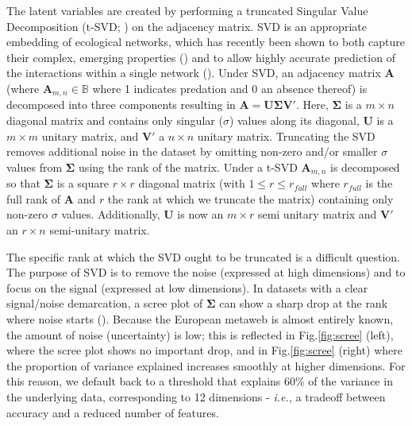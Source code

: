 \begin{refsection}
The latent variables are created by performing a truncated Singular
Value Decomposition (t-SVD; \cite{Halko2011Finding}) on the adjacency
matrix. SVD is an appropriate embedding of ecological networks, which
has recently been shown to both capture their complex, emerging
properties (\cite{Strydom2021SvdEnt}) and to allow highly accurate
prediction of the interactions within a single network
(\cite{Poisot2021ImpMam}). Under SVD, an adjacency matrix \(\mathbf{A}\)
(where \(\mathbf{A}_{m,n}\in\mathbb{B}\) where 1 indicates predation and
0 an absence thereof) is decomposed into three components resulting in
\(\mathbf{A} = \mathbf{U}\mathbf{\Sigma}\mathbf{V'}.\) Here,
\(\mathbf{\Sigma}\) is a \(m \times n\) diagonal matrix and contains
only singular (\(\sigma\)) values along its diagonal, \(\mathbf{U}\) is
a \(m \times m\) unitary matrix, and \(\mathbf{V}'\) a \(n \times n\)
unitary matrix. Truncating the SVD removes additional noise in the
dataset by omitting non-zero and/or smaller \(\sigma\) values from
\(\mathbf{\Sigma}\) using the rank of the matrix. Under a t-SVD
\(\mathbf{A}_{m,n}\) is decomposed so that \(\mathbf{\Sigma}\) is a
square \(r \times r\) diagonal matrix (with \(1 \le r \le r_{full}\)
where \(r_{full}\) is the full rank of \(\mathbf{A}\) and \(r\) the rank
at which we truncate the matrix) containing only non-zero \(\sigma\)
values. Additionally, \(\mathbf{U}\) is now an \(m \times r\) semi
unitary matrix and \(\mathbf{V}'\) an \(r \times n\) semi-unitary
matrix.

The specific rank at which the SVD ought to be truncated is a difficult
question. The purpose of SVD is to remove the noise (expressed at high
dimensions) and to focus on the signal (expressed at low dimensions). In
datasets with a clear signal/noise demarcation, a scree plot of
\(\mathbf{\Sigma}\) can show a sharp drop at the rank where noise starts
(\cite{Zhu2006Automatic}). Because the European metaweb is almost entirely
known, the amount of noise (uncertainty) is low; this is reflected in
Fig.\ref{fig:scree} (left), where the scree plot shows no important drop, and in
Fig.\ref{fig:scree} (right) where the proportion of variance explained increases
smoothly at higher dimensions. For this reason, we default back to a
threshold that explains 60\% of the variance in the underlying data,
corresponding to 12 dimensions - \emph{i.e.,} a tradeoff between accuracy
and a reduced number of features.


\end{refsection}
